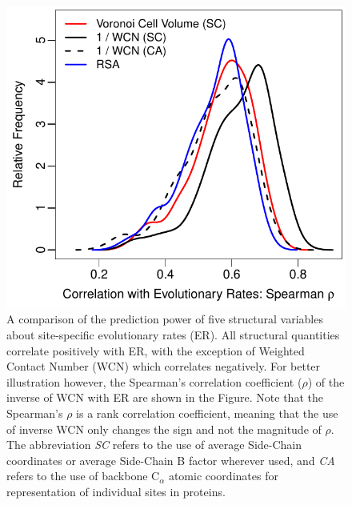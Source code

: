 \documentclass[11pt]{article}
\begin{document}
    \begin{figure}
        \begin{center}
        \includegraphics[width=5.5in]{best_structural_predictors_of_ER_limited.pdf}
        \end{center}
        \caption{A comparison of the prediction power of five structural variables about site-specific evolutionary rates (ER). All structural quantities correlate positively with ER, with the exception of Weighted Contact Number (WCN) which correlates negatively. For better illustration however, the Spearman's correlation coefficient ($\rho$) of the inverse of WCN with ER are shown in the Figure. Note that the Spearman's $\rho$ is a rank correlation coefficient, meaning that the use of inverse WCN only changes the sign and not the magnitude of $\rho$. The abbreviation {\it SC} refers to the use of average Side-Chain coordinates or average Side-Chain B factor wherever used, and {\it CA} refers to the use of backbone C$_\alpha$ atomic coordinates for representation of individual sites in proteins.}
        \label{fig:best_predictorER}
    \end{figure}
\end{document}
